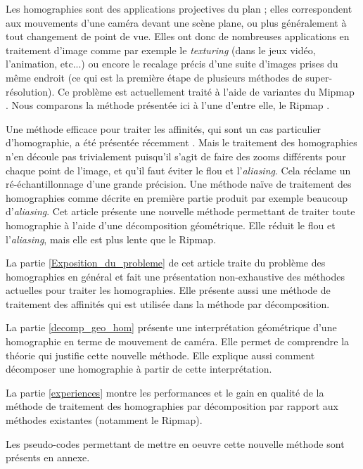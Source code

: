 	Les homographies sont des applications projectives du plan ; elles correspondent aux mouvements d'une caméra devant une scène plane, ou plus généralement à tout changement de point de vue. Elles ont donc de nombreuses applications en traitement d'image comme par exemple le \emph{texturing} \cite{heckbert1983texture} (dans le jeux vidéo, l'animation, etc...) ou encore le recalage précis d'une suite d'images prises du même endroit \cite{brown2007automatic} (ce qui est la première étape de plusieurs méthodes de super-résolution). Ce problème est actuellement traité à l'aide de variantes du Mipmap \cite{williams1983pyramidal}. Nous comparons la méthode présentée ici à l'une d'entre elle, le Ripmap \cite{akenine2008real}.

	Une méthode efficace pour traiter les affinités, qui sont un cas particulier d'homographie, a été présentée récemment \cite{szeliski2010high}. Mais le traitement des homographies n'en découle pas trivialement puisqu'il s'agit de faire des zooms différents pour chaque point de l'image, et qu'il faut éviter le flou et l'\emph{aliasing}. Cela réclame un ré-échantillonnage d'une grande précision. Une méthode naïve de traitement des homographies comme décrite en première partie produit par exemple beaucoup d'\emph{aliasing}. Cet article présente une nouvelle méthode permettant de traiter toute homographie à l'aide d'une décomposition géométrique. Elle réduit le flou et l'\emph{aliasing}, mais elle est plus lente que le Ripmap.

	La partie \ref{Exposition_du_probleme} de cet article traite du problème des homographies en général et fait une présentation non-exhaustive des méthodes actuelles pour traiter les homographies. Elle présente aussi une méthode de traitement des affinités qui est utilisée dans la méthode par décomposition.

	La partie \ref{decomp_geo_hom} présente une interprétation géométrique d'une homographie en terme de mouvement de caméra. Elle permet de comprendre la théorie qui justifie cette nouvelle méthode. Elle explique aussi comment décomposer une homographie à partir de cette interprétation.

	La partie \ref{experiences} montre les performances et le gain en qualité de la méthode de traitement des homographies par décomposition par rapport aux méthodes existantes (notamment le Ripmap).

	Les pseudo-codes permettant de mettre en oeuvre cette nouvelle méthode sont présents en annexe.
